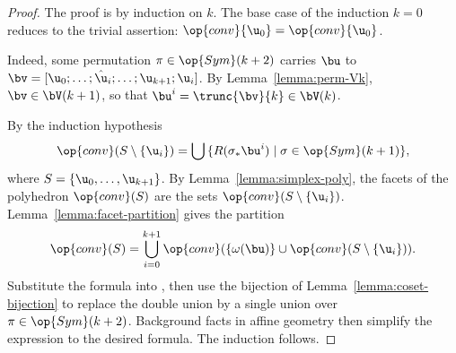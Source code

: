 \begin{proof} The proof is by induction on $k$.  The base case of the induction $k=0$
reduces to the trivial assertion: $\op{conv}\{\u_0\} = \op{conv}\{\u_0\}$.  



  Indeed,  some permutation
$\pi\in \op{Sym}(k+2)$ carries $\bu$ to
$\bv=[\u_0;\ldots;\hat\u_i;\ldots;\u_{k+1};\u_i]$.  By
Lemma~\ref{lemma:perm-Vk}, $\bv\in \bV(k+1)$, so that $\bu^i =
\trunc{\bv}{k}\in \bV(k)$.

By the induction hypothesis 
\begin{equation}\label{eqn:sigma} 
\op{conv}(S\setminus\{\u_i\}) = \bigcup \,\{ R(\sigma_*\bu^i) \mid \sigma\in \op{Sym}(k+1)\},
\end{equation}
where $S = \{\u_0,\ldots,\u_{k+1}\}$.
By Lemma~\ref{lemma:simplex-poly}, the facets of the polyhedron
$\op{conv}(S)$ are the sets $\op{conv}(S\setminus\{\u_i\})$.
Lemma~\ref{lemma:facet-partition} gives the partition
\begin{equation} \label{eqn:convS}
\op{conv}(S) = \bigcup_{i=0}^{k+1} \op{conv}(\{\omega(\bu)\}\cup \op{conv}(S\setminus\{\u_i\})).
\end{equation}
Substitute the formula  into , then use the bijection of
Lemma~\ref{lemma:coset-bijection} to replace the double union by a single union
over $\pi\in \op{Sym}(k+2)$.  Background facts in affine
geometry then simplify the expression to the desired formula.  The
induction follows.
%
%
%
\end{proof}



